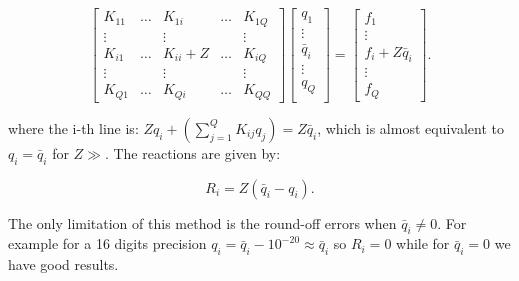 	\begin{equation}
	\left[
	\begin{array}{ccccc}
	K_{11} & \dots & K_{1i} & \dots & K_{1Q}\\
	\vdots & & \vdots & & \vdots\\
	K_{i1}& \dots & K_{ii}+Z & \dots & K_{iQ}\\
	\vdots & & \vdots & & \vdots\\
	K_{Q1}& \dots & K_{Qi} & \dots & K_{QQ}
	\end{array}
	\right]
	\left[
	\begin{array}{c}
	q_{1}\\
	\vdots\\
	\bar{q}_{i}\\
	\vdots\\
	q_Q\\
	\end{array}
	\right]
	=
	\left[
	\begin{array}{c}
	f_{1}\\
	\vdots\\
	f_i + Z\bar{q}_i\\
	\vdots\\
	f_Q
	\end{array}
	\right].
	\end{equation}
	
	where the i-th line is: $Zq_i + \left( \sum _{j=1}^Q K_{ij}q_j \right) = Z\bar{q}_i$, which is almost equivalent to $q_i = \bar{q} _i$ for $Z\gg$. The reactions are given by:
	
	\begin{equation}
	R_i = Z(\bar{q}_i - q_i). 
	\end{equation}
	
	The only limitation of this method is the round-off errors when $\bar{q}_i \neq 0$. For example for a 16 digits precision $q_i = \bar{q}_i - 10^{-20} \approx \bar{q}_i$ so $R_i = 0$ while for $\bar{q}_i = 0$ we have good results. 